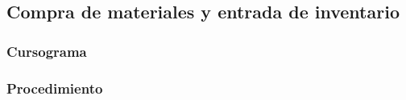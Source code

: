 \subsection{Compra de materiales y entrada de inventario}

\subsubsection{Cursograma}

\subsubsection{Procedimiento}


